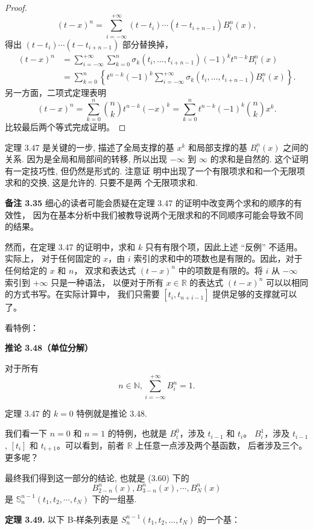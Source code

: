 \documentclass[a4paper]{ctexart}
\begin{document}
{\begin{proof}
\[
(t-x)^n = \sum_{i=-\infty}^{+\infty} (t-t_i) \cdots(t-t_{i+n-1}) B_i^n(x),
\]
  得出 $(t-t_i) \cdots(t-t_{i+n-1})$ 部分替换掉，
  \begin{align*}
  (t - x)^n &= \sum_{i=-\infty}^{+\infty} \sum_{k=0}^n \sigma_k(t_i, \ldots, t_{i+n-1})(-1)^k t^{n-k} B_i^n(x) \\
  &= \sum_{k=0}^n \left\{ t^{n-k} (-1)^k \sum_{i=-\infty}^{+\infty} \sigma_k(t_i, \ldots, t_{i+n-1}) B_i^n(x) \right\}.
  \end{align*}
  另一方面，二项式定理表明
  \[
  (t - x)^n = \sum_{k=0}^n \binom{n}{k} t^{n-k} (-x)^k = \sum_{k=0}^n t^{n-k} (-1)^k \binom{n}{k} x^k.
  \]
  比较最后两个等式完成证明。
\end{proof}

定理 3.47 是关键的一步, 描述了全局支撑的基 $x^k$ 和局部支撑的基
$B_i^n(x)$ 之间的关系. 因为是全局和局部间的转移, 所以出现 $-\infty$ 到
$\infty$ 的求和是自然的. 这个证明有一定技巧性, 但仍然是形式的. 注意证
明中出现了一个有限项求和和一个无限项求和的交换, 这是允许的. 只要不是两
个无限项求和.

\noindent \textbf{备注 3.35} 细心的读者可能会质疑在定理 3.47 的证明中改变两个求和的顺序的有效性，
因为在基本分析中我们被教导说两个无限求和的不同顺序可能会导致不同的结果。

然而，在定理 3.47 的证明中，求和 $k$ 只有有限个项，因此上述 ``反例'' 不适用。实际上，
对于任何固定的 $x$，由 $i$ 索引的求和中的项数也是有限的。因此，对于任何给定的 $x$ 和 $n$，
双求和表达式 $(t - x)^n$ 中的项数是有限的。将 $i$ 从 $-\infty$ 索引到 $+\infty$ 只是一种语法，
以便对于所有 $x \in \mathbb{R}$ 的表达式 $(t - x)^n$ 可以以相同的方式书写。在实际计算中，
我们只需要 $[t_i, t_{n + i - 1}]$ 提供足够的支撑就可以了。

看特例：

\noindent \textbf{推论 3.48（单位分解）}

对于所有 
\[
n \in \mathbb{N}, \sum_{i=-\infty}^{+\infty} B_i^n = 1. \tag{3.59}
\]

定理 3.47 的 $k = 0$ 特例就是推论 3.48.

我们看一下 $n = 0$ 和 $n = 1$ 的特例，也就是 $B_i^0$，涉及 $t_{i - 1}$ 和 $t_i$。
$B_i^1$，涉及 $t_{i - 1}$, $[t_i]$ 和 $t_{i + 1}$。可以看到，前者 $\mathbb{R}$ 上任意一点涉及两个基函数，
后者涉及三个。更多呢？

最终我们得到这一部分的结论, 也就是 (3.60) 下的
$$
B_{2 - n}^n(x), B_{3 - n}^n(x), \cdots, B_{N}^n(x)
$$
是 $\mathbb{S}_n^{n - 1}(t_1, t_2, \cdots, t_N)$ 下的一组基.

\noindent \textbf{定理 3.49.} 以下 B-样条列表是 $S_{n}^{n-1}\left(t_{1}, t_{2},\ldots, t_{N}\right)$ 的一个基：

}
\end{document}
